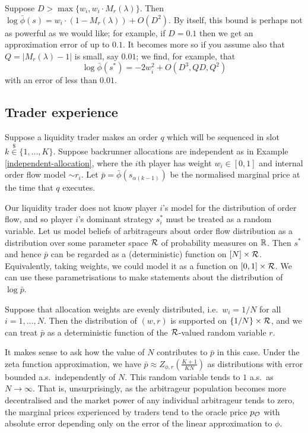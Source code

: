 \begin{example}

  Suppose $D>\max\{w_i,w_i\cdot M_r(\lambda)\}$.
  Then $\log\bar\phi(s) = w_i\cdot(1 - M_r(\lambda)) + O(D^2)$.
%
By itself, this bound is perhaps not as powerful as we would like; for example, if $D=0.1$ then we get an approximation error of up to $0.1$.
%
It becomes more so if you assume also that $Q=|M_r(\lambda)-1|$ is small, say $0.01$; we find, for example, that
\[
  \log\bar\phi({s^*}) = -2w_i^2 + O(D^3, QD, Q^2)
\]
with an error of less than $0.01$.

\end{example}


\subsection{Trader experience}
%
Suppose a liquidity trader makes an order $q$ which will be sequenced in slot $k\stackrel{\$}{\in}\{1,\ldots,K\}$.
%
Suppose backrunner allocations are independent as in Example \ref{independent-allocation}, where the $i$th player has weight $w_i\in[0,1]$ and internal order flow model $\sim r_i$.
%
Let $\bar p=\bar\phi(s_{\alpha(k-1)})$ be the normalised marginal price at the time that $q$ executes.

Our liquidity trader does not know player $i$'s model for the distribution of order flow, and so player $i$'s dominant strategy $s_i^*$ must be treated as a random variable.
%
Let us model beliefs of arbitrageurs about order flow distribution as a distribution over some parameter space $\mathcal{R}$ of probability measures on $\mathbb R$.
%
Then $s^*$ and hence $\bar p$ can be regarded as a (deterministic) function on $[N]\times\mathcal{R}$.
%
Equivalently, taking weights, we could model it as a function on $[0,1]\times\mathcal{R}$.
%
We can use these parametrisations to make statements about the distribution of $\log\bar p$.

\begin{example}

  Suppose that allocation weights are evenly distributed, i.e.~$w_i=1/N$ for all $i=1,\ldots,N$.
  Then the distribution of $(w,r)$ is supported on $\{1/N\}\times\mathcal{R}$, and we can treat $\bar p$ as a deterministic function of the $\mathcal{R}$-valued random variable $r$.
  
  It makes sense to ask how the value of $N$ contributes to $\bar p$ in this case.
  Under the zeta function approximation, we have $\bar p\approx Z_{\phi,r}\left(\frac{K+1}{KN}\right)$ as distributions with error bounded a.s.~independently of $N$.
  This random variable tends to $1$ a.s.~as $N\rightarrow\infty$.
  That is, unsurprisingly, as the arbitrageur population becomes more decentralised and the market power of any individual arbitrageur tends to zero, the marginal prices experienced by traders tend to the oracle price $p_{\mathcal{O}}$ with absolute error depending only on the error of the linear approximation to $\phi$.

\end{example}



